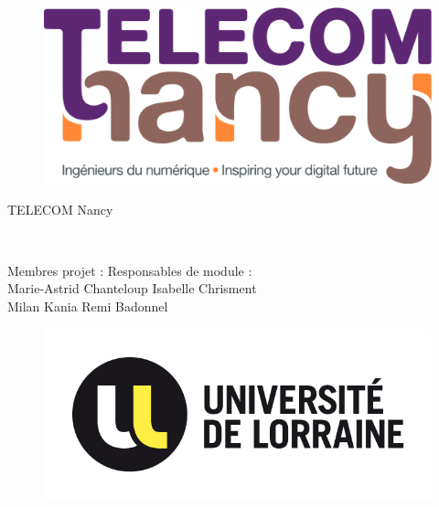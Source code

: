
\thispagestyle{empty}

\vskip 1cm

\begin{figure}[ht!]
    \centering
    \includegraphics[scale = 0.11]{imagePG/logoTNCY.png}
    \label{fig:logo_TNCY}
\end{figure}
\vskip 0.3cm
\begin{center}
\begin{LARGE}
TELECOM Nancy
\\
\vskip 2.7cm
\matiere
\end{LARGE}
\\
\vskip 2.7cm
\hline
\vskip 1.8cm
\begin{Huge}
\textbf{\titre}
\end{Huge}
\vskip 1.8cm
\hline
\end{center}

\vskip 1.5cm

\begin{Large}
\noindent Membres projet :
\hfill{} Responsables de module :\\
Marie-Astrid Chanteloup 
\hfill{} Isabelle Chrisment\\
Milan Kania
\hfill{} Remi Badonnel \\

\end{Large}


\begin{figure}
    \centering
    \includegraphics[scale = 1.8]{imagePG/logo_UL.jpg}
\end{figure}

